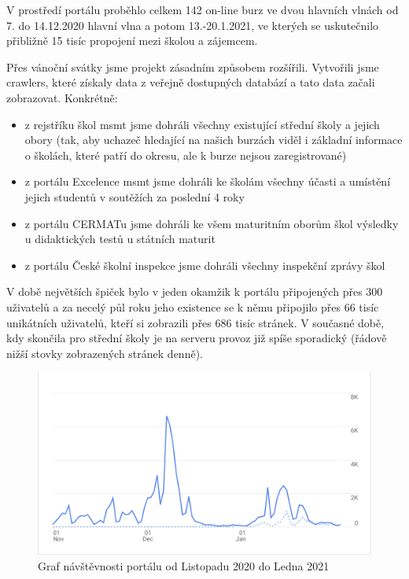 V prostředí portálu proběhlo celkem 142 on-line burz ve dvou hlavních vlnách od 7. do 14.12.2020 \emdash hlavní vlna a potom 13.-20.1.2021,
ve kterých se uskutečnilo přibližně 15 tisíc propojení mezi školou a zájemcem. 

Přes vánoční svátky jsme projekt zásadním způsobem rozšířili.
Vytvořili jsme \glspl{crawler}, které získaly data z veřejně dostupných databází a tato data začali zobrazovat. Konkrétně: 

\begin{itemize}
  \item z rejstříku škol \acrshort{msmt} jsme dohráli všechny existující střední školy a jejich obory (tak, aby uchazeč hledající na našich burzách viděl i základní informace o školách, které patří do okresu, ale k burze nejsou zaregistrované)
  \item z portálu Excelence \acrshort{msmt} jsme dohráli ke školám všechny účasti a umístění jejich studentů v soutěžích za poslední 4 roky
  \item z portálu CERMATu jsme dohráli ke všem maturitním oborům škol výsledky u didaktických testů u státních maturit
  \item z portálu České školní inspekce jsme dohráli všechny inspekční zprávy škol
\end{itemize}

V době největších špiček bylo v jeden okamžik k portálu připojených přes 300 uživatelů 
a za necelý půl roku jeho existence se k němu připojilo přes 66 tisíc unikátních uživatelů,
kteří si zobrazili přes 686 tisíc stránek.
V současné době, kdy skončila pro střední školy  je na serveru provoz již spíše sporadický (řádově nižší stovky zobrazených stránek denně). 


\begin{figure}[h]
\centering
\includegraphics[width=\textwidth]{img/listopad-leden-navstevnost.png}
\caption{Graf návštěvnosti portálu \bso{} od Listopadu 2020 do Ledna 2021}\label{fig:navstevnost}
\end{figure}

